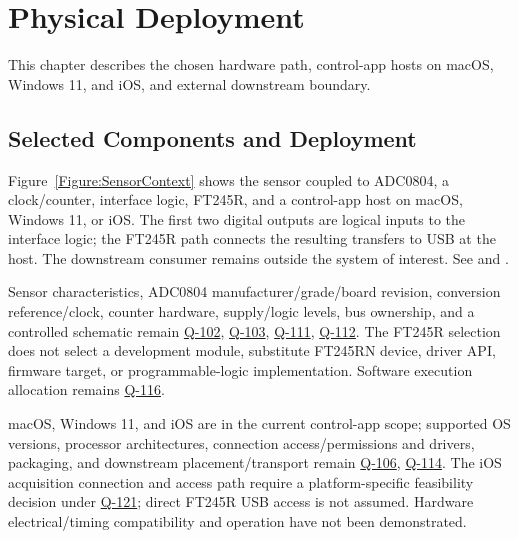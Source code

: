 \chapter{Physical Deployment}
\label{Section:PhysicalViewResponsibility}
This chapter describes the chosen hardware path, control-app hosts on macOS, Windows 11, and iOS, and external downstream boundary.


\section{Selected Components and Deployment}
Figure~\ref{Figure:SensorContext} shows the sensor coupled to ADC0804, a clock/counter, interface logic, FT245R, and a control-app host on macOS, Windows 11, or iOS. The first two digital outputs are logical inputs to the interface logic; the FT245R path connects the resulting transfers to USB at the host. The downstream consumer remains outside the system of interest. See  and .

Sensor characteristics, ADC0804 manufacturer/grade/board revision, conversion reference/clock, counter hardware, supply/logic levels, bus ownership, and a controlled schematic remain \hyperref[Question:Q-102]{Q-102}, \hyperref[Question:Q-103]{Q-103}, \hyperref[Question:Q-111]{Q-111}, \hyperref[Question:Q-112]{Q-112}. The FT245R selection does not select a development module, substitute FT245RN device, driver API, firmware target, or programmable-logic implementation. Software execution allocation remains \hyperref[Question:Q-116]{Q-116}.

macOS, Windows 11, and iOS are in the current control-app scope; supported OS versions, processor architectures, connection access/permissions and drivers, packaging, and downstream placement/transport remain \hyperref[Question:Q-106]{Q-106}, \hyperref[Question:Q-114]{Q-114}. The iOS acquisition connection and access path require a platform-specific feasibility decision under \hyperref[Question:Q-121]{Q-121}; direct FT245R USB access is not assumed. Hardware electrical/timing compatibility and operation have not been demonstrated.
